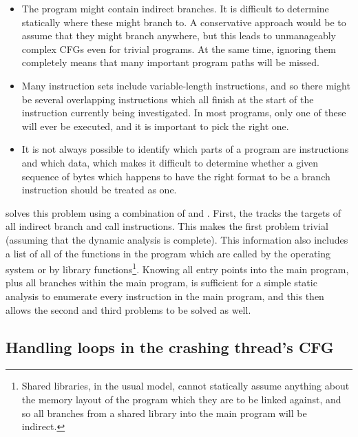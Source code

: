 \begin{itemize}
\item
  The program might contain indirect branches.  It is difficult to
  determine statically where these might branch to.  A conservative
  approach would be to assume that they might branch anywhere, but
  this leads to unmanageably complex CFGs even for trivial programs.
  At the same time, ignoring them completely means that many important
  program paths will be missed.
\item
  Many instruction sets include variable-length instructions, and so
  there might be several overlapping instructions which all finish at
  the start of the instruction currently being investigated.  In most
  programs, only one of these will ever be executed, and it is
  important to pick the right one.
\item
  It is not always possible to identify which parts of a program are
  instructions and which data, which makes it difficult to determine
  whether a given sequence of bytes which happens to have the right
  format to be a branch instruction should be treated as one.
\end{itemize}

{\Implementation} solves this problem using a combination of
 and .  First, the
 tracks the targets of all indirect branch
and call instructions.  This makes the first problem trivial (assuming
that the dynamic analysis is complete).  This information also
includes a list of all of the functions in the program which are
called by the operating system or by library functions\footnote{Shared
  libraries, in the usual model, cannot statically assume anything
  about the memory layout of the program which they are to be linked
  against, and so all branches from a shared library into the main
  program will be indirect.}.  Knowing all entry points into the main
program, plus all branches within the main program, is sufficient for
a simple static analysis to enumerate every instruction in the main
program, and this then allows the second and third problems to be
solved as well.


\subsection{Handling loops in the crashing thread's CFG}
\label{sect:derive:handling_loops}

